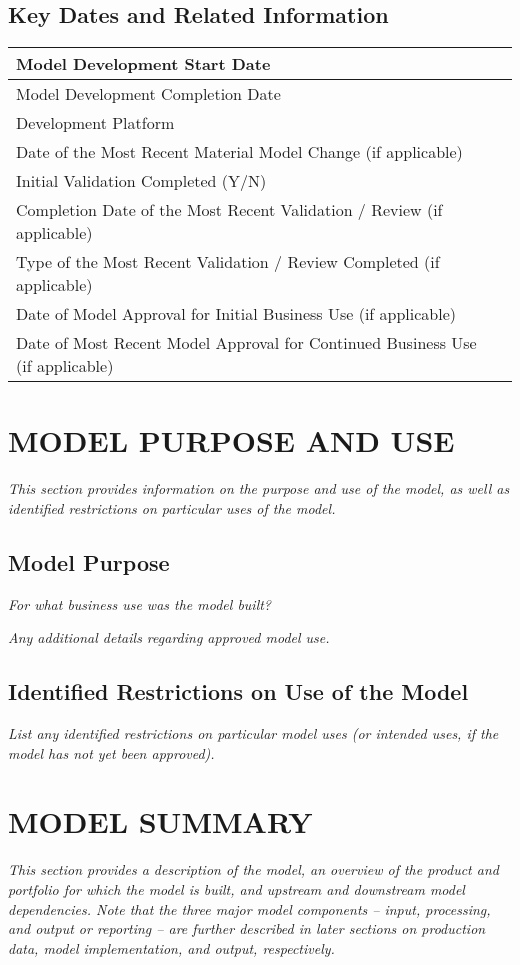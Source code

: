 \documentclass[12pt,letterpaper]{article}
\begin{document}
\subsection{Key Dates and Related Information}

\begin{tabular}{|p{}|p{}|}
\hline
Model Development Start Date & \\
\hline
Model Development Completion Date & \\
\hline
Development Platform & \\
\hline
Date of the Most Recent Material Model Change (if applicable) & \\
\hline
Initial Validation Completed (Y/N) & \\
\hline
Completion Date of the Most Recent Validation / Review (if applicable) & \\
\hline
Type of the Most Recent Validation / Review Completed (if applicable) & \\
\hline
Date of Model Approval for Initial Business Use (if applicable) & \\
\hline
Date of Most Recent Model Approval for Continued Business Use (if applicable) & \\
\hline
\end{tabular}

\section{MODEL PURPOSE AND USE}
\textit{This section provides information on the purpose and use of the model, as well as identified restrictions on particular uses of the model.}

\subsection{Model Purpose}
\textit{For what business use was the model built?}

\textit{Any additional details regarding approved model use.}

\subsection{Identified Restrictions on Use of the Model}
\textit{List any identified restrictions on particular model uses (or intended uses, if the model has not yet been approved).}

\section{MODEL SUMMARY}
\textit{This section provides a description of the model, an overview of the product and portfolio for which the model is built, and upstream and downstream model dependencies. Note that the three major model components -- input, processing, and output or reporting -- are further described in later sections on production data, model implementation, and output, respectively.}
\end{document}
